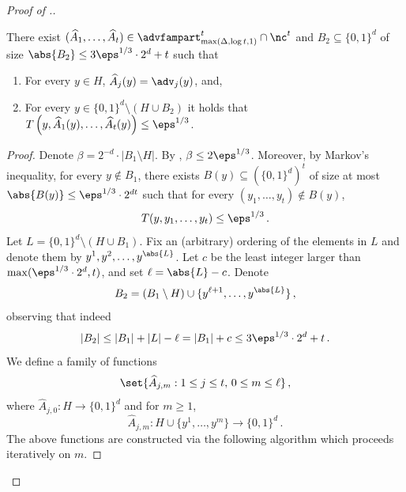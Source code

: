 \documentclass{toc}
\begin{document}
\begin{proof}[Proof of .]
\begin{proposition}\label{c: pi construction}
There exist $(\widehat{A}_1,\ldots,\widehat{A}_t) \in  \advfampart^t_{\max(\Delta, \log t,1)} \cap \nc^t$ and $B_2 \subseteq \{0,1\}^d$ of size $\abs{B_2} \le 3\eps^{1/3}\cdot 2^d + t$ such that
\begin{enumerate}
  \item\label{it:c1} For every $y \in H$, $\widehat{A}_j(y) = \adv_j(y)$, and,
  \item\label{it:c2} For every $y \in \{0,1\}^d \setminus (H \cup B_2)$ it holds that $T\left(y,\widehat{A}_1(y), \ldots, \widehat{A}_t(y)\right) \le \eps^{1/3}$.
\end{enumerate}
\end{proposition}

\begin{proof}

Denote $\beta = 2^{-d} \cdot |B_1\setminus H|$. 
By , $\beta \leq 2\eps^{1/3}$. Moreover, by Markov's inequality, for every $y \notin B_1$, there exists $B(y) \subseteq (\{0,1\}^d)^t$ of size at most $\abs{B(y)} \leq  \eps^{1/3} \cdot 2^{dt}$ such that for every $(y_1,\ldots,y_t) \notin B(y)$, \[T(y,y_1,\ldots,y_t) \le \eps^{1/3}\,.\]
Let $L = \{0,1\}^d \setminus (H \cup B_1)$. Fix an (arbitrary) ordering of the elements in $L$ and denote them by $y^1,y^2,\ldots,y^{\abs{L}}$. Let $c$ be the least integer larger than $\max(\eps^{1/3} \cdot 2^d, t)$, and set $\ell = \abs{L} - c$. Denote \[B_2 = (B_1\setminus H) \cup \{y^{\ell+1},\ldots, y^{\abs{L}}\}\,,\] observing that indeed
\[
|B_2| \le |B_1| + |L|-\ell = |B_1| +c \le 3\eps^{1/3}\cdot 2^d + t\,.
\]
%
We define a family of functions
\[
\set{\widehat{A}_{j,m} : 1 \le j \le t,\, 0 \le m \le \ell}\,,
\]
where $\widehat{A}_{j,0} \colon H  \rightarrow \{0,1\}^d$ and for $m \ge 1$,
\[\widehat{A}_{j,m} \colon H \cup \{y^1,\ldots, y^{m}\} \rightarrow \{0,1\}^d\,.\]
The above functions are constructed via the following algorithm which proceeds iteratively on $m$.%

%

\end{proof}
\end{proof}
\end{document}
